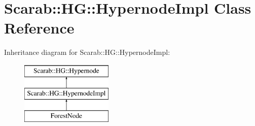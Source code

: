 \hypertarget{class_scarab_1_1_h_g_1_1_hypernode_impl}{
\section{Scarab::HG::HypernodeImpl Class Reference}
\label{class_scarab_1_1_h_g_1_1_hypernode_impl}
}
Inheritance diagram for Scarab::HG::HypernodeImpl:\begin{figure}[H]
\begin{center}
\leavevmode
\includegraphics[height=3cm]{class_scarab_1_1_h_g_1_1_hypernode_impl}
\end{center}
\end{figure}
